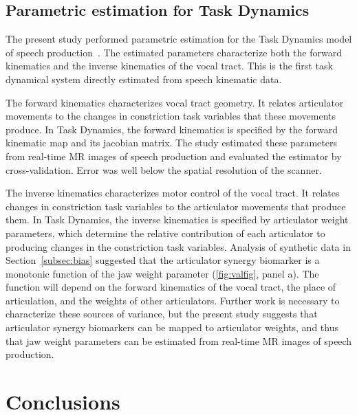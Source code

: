 \documentclass[reprint]{JASAnew}\usepackage[]{graphicx}\usepackage[]{color}
\begin{document}
\subsection{Parametric estimation for Task Dynamics}

The present study performed parametric estimation for the Task Dynamics model of speech production~\citep{saltzman1989dynamical}. The estimated parameters characterize both the forward kinematics and the inverse kinematics of the vocal tract. This is the first task dynamical system directly estimated from speech kinematic data. 

The forward kinematics characterizes vocal tract geometry. It relates articulator movements to the changes in constriction task variables that these movements produce. 
%
In Task Dynamics, the forward kinematics is specified by the forward kinematic map and its jacobian matrix. 
%
The study estimated these parameters from real-time MR images of speech production and evaluated the estimator by cross-validation. Error was well below the spatial resolution of the scanner.

The inverse kinematics characterizes motor control of the vocal tract.
It relates changes in constriction task variables to the articulator movements that produce them.
In Task Dynamics, the inverse kinematics is specified by articulator weight parameters, which determine the relative contribution of each articulator to producing changes in the constriction task variables.
%
Analysis of synthetic data in Section~\ref{subsec:bias} suggested that the articulator synergy biomarker is a monotonic function of the jaw weight parameter (\ref{fig:valfig}, panel a).
%
The function will depend on the forward kinematics of the vocal tract, the place of articulation, and the weights of other articulators. Further work is necessary to characterize these sources of variance, but the present study suggests that articulator synergy biomarkers can be mapped to articulator weights, and thus that jaw weight parameters can be estimated from real-time MR images of speech production.







\section{Conclusions}
\label{sec:conclusions}
\end{document}
